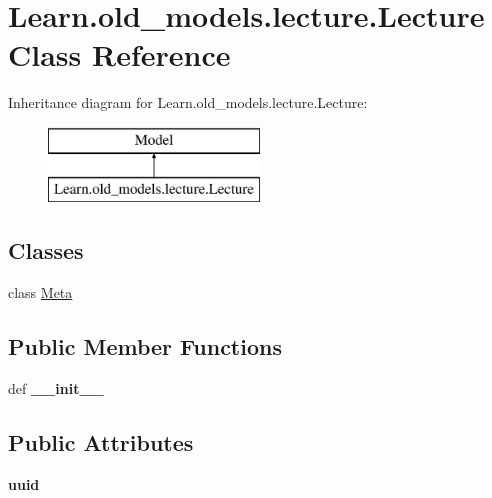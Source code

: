 \hypertarget{class_learn_1_1old__models_1_1lecture_1_1_lecture}{\section{Learn.\-old\-\_\-models.\-lecture.\-Lecture Class Reference}
\label{class_learn_1_1old__models_1_1lecture_1_1_lecture}
}
Inheritance diagram for Learn.\-old\-\_\-models.\-lecture.\-Lecture\-:\begin{figure}[H]
\begin{center}
\leavevmode
\includegraphics[height=2.000000cm]{class_learn_1_1old__models_1_1lecture_1_1_lecture}
\end{center}
\end{figure}
\subsection*{Classes}
\begin{DoxyCompactItemize}
\item 
class \hyperlink{class_learn_1_1old__models_1_1lecture_1_1_lecture_1_1_meta}{Meta}
\end{DoxyCompactItemize}
\subsection*{Public Member Functions}
\begin{DoxyCompactItemize}
\item 
\hypertarget{class_learn_1_1old__models_1_1lecture_1_1_lecture_a16803c9b0489d53e43de7c03ef5635d8}{def {\bfseries \-\_\-\-\_\-init\-\_\-\-\_\-}}\label{class_learn_1_1old__models_1_1lecture_1_1_lecture_a16803c9b0489d53e43de7c03ef5635d8}

\end{DoxyCompactItemize}
\subsection*{Public Attributes}
\begin{DoxyCompactItemize}
\item 
\hypertarget{class_learn_1_1old__models_1_1lecture_1_1_lecture_a366f435d7adb01ee95ecc79d319fef24}{{\bfseries uuid}}\label{class_learn_1_1old__models_1_1lecture_1_1_lecture_a366f435d7adb01ee95ecc79d319fef24}

\end{DoxyCompactItemize}
